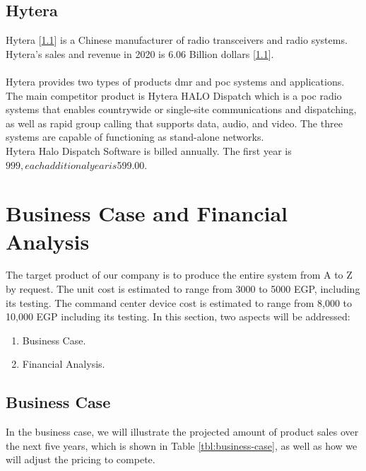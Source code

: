 \subsection{Hytera}
Hytera [\ref{}] is a Chinese manufacturer of radio transceivers and radio systems. Hytera's sales and revenue in 2020 is 6.06 Billion dollars [\ref{}].
\\
\\
Hytera provides two types of products \acrfull{dmr} and \acrfull{poc} systems and applications.
The main competitor product is Hytera HALO Dispatch which is a \acrfull{poc} radio systems that enables countrywide or single-site communications and dispatching, as well as rapid group calling that supports data, audio, and video. The three systems are capable of functioning as stand-alone networks.
\\
Hytera Halo Dispatch Software is billed annually. The first year is $999, each additional year is $599.00.

\section{Business Case and Financial Analysis }
The target product of our company is to produce the entire system from A to Z by request. The unit cost is estimated to range from 3000 to 5000 EGP, including its testing. The command center device cost is estimated to range from 8,000 to 10,000 EGP including its testing.
In this section, two aspects will be addressed:
\begin{enumerate}[itemsep=1pt, topsep=5pt]
    \item Business Case.
    \item Financial Analysis.
\end{enumerate}

\subsection{Business Case}
In the business case, we will illustrate the projected amount of product sales over the next five years, which is shown in Table \ref{tbl:business-case}, as well as how we will adjust the pricing to compete.

